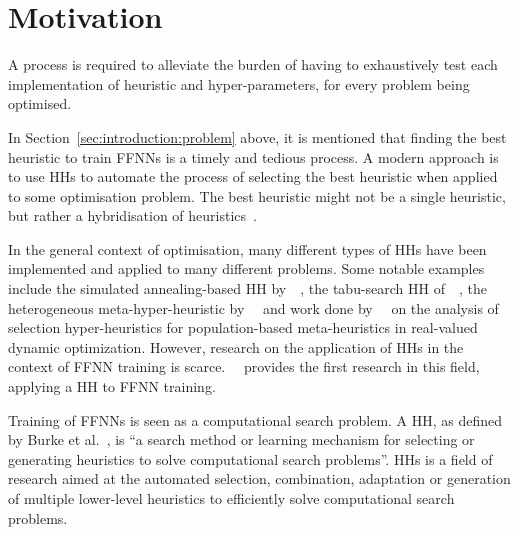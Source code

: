 \section{Motivation}\label{sec:introduction:motivation}

A process is required to alleviate the burden of having to exhaustively test each implementation of heuristic and hyper-parameters, for every problem being optimised.

In Section~\ref{sec:introduction:problem} above, it is mentioned that finding the best heuristic to train \acp{FFNN} is a timely and tedious process. A modern approach is to use \acp{HH} to automate the process of selecting the best heuristic when applied to some optimisation problem. The best heuristic might not be a single heuristic, but rather a hybridisation of heuristics~\cite{ref:pillay:2015}.

In the general context of optimisation, many different types of \acp{HH} have been implemented and applied to many different problems. Some notable examples include the simulated annealing-based \acs{HH} by~\citeauthor{ref:dowsland:2007}~\cite{ref:dowsland:2007}, the tabu-search \acs{HH} of~\citeauthor{ref:burke:2010}~\cite{ref:burke:2010}, the heterogeneous meta-hyper-heuristic by~\citeauthor{ref:grobler:2012}~\cite{ref:grobler:2012} and work done by~\citeauthor{ref:vanderstockt:2018}~\cite{ref:vanderstockt:2018} on the analysis of selection hyper-heuristics for population-based meta-heuristics in real-valued dynamic optimization. However, research on the application of \acp{HH} in the context of \acs{FFNN} training is scarce.~\citeauthor{ref:nel:2021}~\cite{ref:nel:2021} provides the first research in this field, applying a \acs{HH} to \acs{FFNN} training.

Training of \acp{FFNN} is seen as a computational search problem. A \acf{HH}, as defined by Burke et al.~\cite{ref:burke:2010}, is ``a search method or learning mechanism for selecting or generating heuristics to solve computational search problems''. \acp{HH} is a field of research aimed at the automated selection, combination, adaptation or generation of multiple lower-level heuristics to efficiently solve computational search problems.

